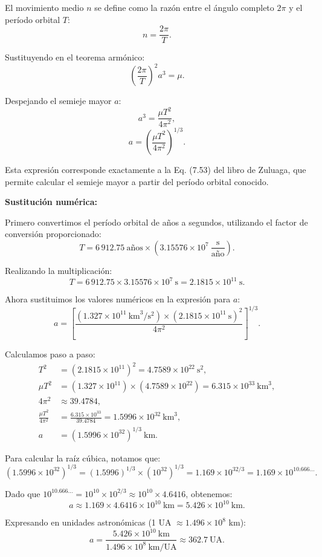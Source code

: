 \documentclass[12pt, a4paper]{article}
\begin{document}
El movimiento medio $n$ se define como la razón entre el ángulo completo $2\pi$ y el período orbital $T$:
$$n = \frac{2\pi}{T}.$$

Sustituyendo en el teorema armónico:
$$\left(\frac{2\pi}{T}\right)^2 a^3 = \mu.$$

Despejando el semieje mayor $a$:
$$a^3 = \frac{\mu T^2}{4\pi^2},$$
$$\boxed{a = \left(\frac{\mu T^2}{4\pi^2}\right)^{1/3}}.$$

Esta expresión corresponde exactamente a la Eq. (7.53) del libro de Zuluaga, que permite calcular el semieje mayor a partir del período orbital conocido.

\textbf{Sustitución numérica:}

Primero convertimos el período orbital de años a segundos, utilizando el factor de conversión proporcionado:
$$T = 6\,912.75~\text{años} \times \left(3.15576 \times 10^7~\frac{\text{s}}{\text{año}}\right).$$

Realizando la multiplicación:
$$T = 6\,912.75 \times 3.15576 \times 10^7~\text{s} = 2.1815 \times 10^{11}~\text{s}.$$

Ahora sustituimos los valores numéricos en la expresión para $a$:
$$a = \left[\frac{(1.327 \times 10^{11}~\text{km}^3/\text{s}^2) \times (2.1815 \times 10^{11}~\text{s})^2}{4\pi^2}\right]^{1/3}.$$

Calculamos paso a paso:
\begin{align*}
    T^2 &= (2.1815 \times 10^{11})^2 = 4.7589 \times 10^{22}~\text{s}^2,\\
    \mu T^2 &= (1.327 \times 10^{11}) \times (4.7589 \times 10^{22}) = 6.315 \times 10^{33}~\text{km}^3,\\
    4\pi^2 &\approx 39.4784,\\
    \frac{\mu T^2}{4\pi^2} &= \frac{6.315 \times 10^{33}}{39.4784} = 1.5996 \times 10^{32}~\text{km}^3,\\
    a &= (1.5996 \times 10^{32})^{1/3}~\text{km}.
\end{align*}

Para calcular la raíz cúbica, notamos que:
$$(1.5996 \times 10^{32})^{1/3} = (1.5996)^{1/3} \times (10^{32})^{1/3} = 1.169 \times 10^{32/3} = 1.169 \times 10^{10.666...}.$$

Dado que $10^{10.666...} = 10^{10} \times 10^{2/3} \approx 10^{10} \times 4.6416$, obtenemos:
$$a \approx 1.169 \times 4.6416 \times 10^{10}~\text{km} = 5.426 \times 10^{10}~\text{km}.$$

Expresando en unidades astronómicas (1 UA $\approx 1.496 \times 10^8$ km):
$$a = \frac{5.426 \times 10^{10}~\text{km}}{1.496 \times 10^8~\text{km/UA}} \approx 362.7~\text{UA}.$$
\end{document}
